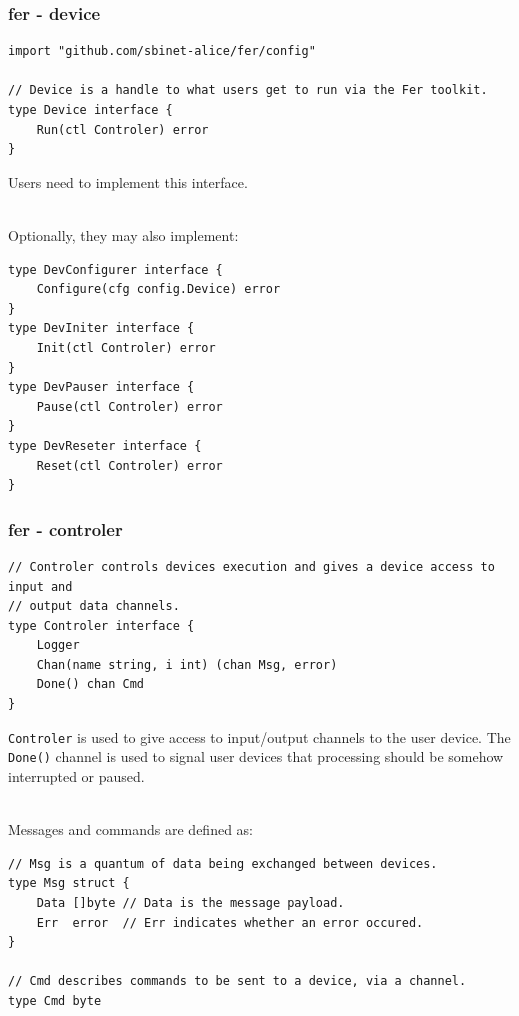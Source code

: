 \documentclass[9pt]{beamer}
\begin{document}
\begin{frame}[fragile]
\frametitle{fer - device}


\begin{verbatim}
import "github.com/sbinet-alice/fer/config"

// Device is a handle to what users get to run via the Fer toolkit.
type Device interface {
	Run(ctl Controler) error
}

\end{verbatim}

Users need to implement this interface.

\quad\\

Optionally, they may also implement:


\begin{verbatim}
type DevConfigurer interface {
	Configure(cfg config.Device) error
}
type DevIniter interface {
	Init(ctl Controler) error
}
type DevPauser interface {
	Pause(ctl Controler) error
}
type DevReseter interface {
	Reset(ctl Controler) error
}

\end{verbatim}


\end{frame}

\begin{frame}[fragile]
\frametitle{fer - controler}


\begin{verbatim}
// Controler controls devices execution and gives a device access to input and
// output data channels.
type Controler interface {
	Logger
	Chan(name string, i int) (chan Msg, error)
	Done() chan Cmd
}

\end{verbatim}

\texttt{Controler} is used to give access to input/output channels to the user device.
The \texttt{Done()} channel is used to signal user devices that processing should be somehow interrupted or paused.

\quad\\
Messages and commands are defined as:


\begin{verbatim}
// Msg is a quantum of data being exchanged between devices.
type Msg struct {
	Data []byte // Data is the message payload.
	Err  error  // Err indicates whether an error occured.
}

// Cmd describes commands to be sent to a device, via a channel.
type Cmd byte

\end{verbatim}


\end{frame}
\end{document}
